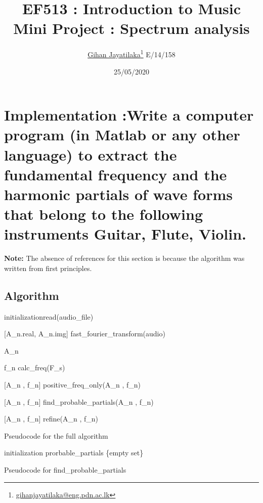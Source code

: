 \documentclass{article}
\title{EF513 : Introduction to Music \\Mini Project : Spectrum analysis}
\author{\href{https://gihan.me}{Gihan Jayatilaka}\footnote{\href{mailto:gihanjayatilaka@eng.pdn.ac.lk}{gihanjayatilaka@eng.pdn.ac.lk}} \hspace{1cm} E/14/158}
\date{25/05/2020}
\begin{document}
\maketitle

\section{Implementation :Write a computer program (in Matlab or any other language) to extract the fundamental frequency and the harmonic partials of wave forms that belong to the following instruments Guitar, Flute, Violin.}
\textbf{Note: }The absence of references for this section is because the algorithm was written from first principles.\\

\subsection{Algorithm}
\begin{algorithm}[H]
 initialization\;
 [audio,F_s] \gets read(audio\_file)\;
 
 [A_n.real, A_n.img] \gets fast\_fourier\_transform(audio)\;
 
 A_n \gets {}
 
 f_n \gets calc\_freq(F_s)\;
 
 [A_n , f_n] \gets positive\_freq\_only(A_n , f_n)\;

 [A_n , f_n] \gets find\_probable\_partials(A_n , f_n)\;
 
 [A_n , f_n] \gets refine(A_n , f_n)\;
    
\caption{Pseudocode for the full algorithm}
\end{algorithm}
\vspace{1cm}
\begin{algorithm}[H]
 initialization\;
    prorbable\_partials \gets \{empty set\}\;
    
\caption{Pseudocode for find\_probable\_partials}
\end{algorithm}

\vspace{1cm}
\end{document}
